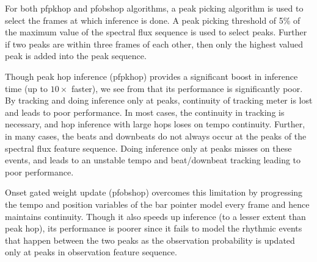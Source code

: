 For both \acrshort{pfpkhop} and \acrshort{pfobshop} algorithms, a peak picking algorithm is used to select the frames at which inference is done. A peak picking threshold of 5\% of the maximum value of the spectral flux sequence is used to select peaks. Further if two peaks are within three frames of each other, then only the highest valued peak is added into the peak sequence. 

Though peak hop inference (\acrshort{pfpkhop}) provides a significant boost in inference time (up to $10\times$ faster), we see from  that its performance is significantly poor. By tracking and doing inference only at peaks, continuity of tracking meter is lost and leads to poor performance. In most cases, the continuity in tracking is necessary, and hop inference with large hops loses on tempo continuity. Further, in many cases, the beats and downbeats do not always occur at the peaks of the spectral flux feature sequence. Doing inference only at peaks misses on these events, and leads to an unstable tempo and beat/downbeat tracking leading to poor performance. 

Onset gated weight update (\acrshort{pfobshop}) overcomes this limitation by progressing the tempo and position variables of the bar pointer model every frame and hence maintains continuity. Though it also speeds up inference (to a lesser extent than peak hop), its performance is poorer since it fails to model the rhythmic events that happen between the two peaks as the observation probability is updated only at peaks in observation feature sequence. 

